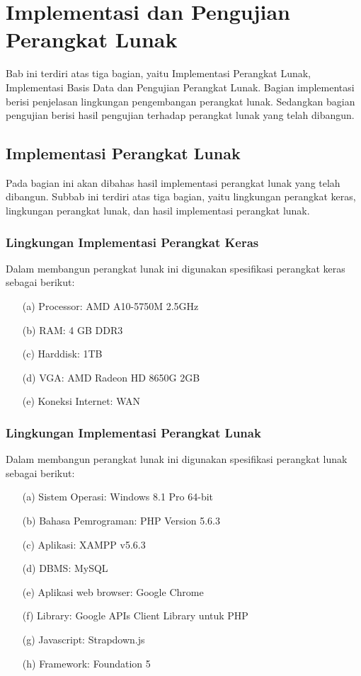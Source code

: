 \chapter{Implementasi dan Pengujian Perangkat Lunak}
\label{chap:implementasidanpengujian}

Bab ini terdiri atas tiga bagian, yaitu Implementasi Perangkat Lunak, Implementasi Basis Data dan Pengujian Perangkat Lunak. Bagian implementasi berisi penjelasan lingkungan pengembangan perangkat lunak. Sedangkan bagian pengujian berisi hasil pengujian terhadap perangkat lunak yang telah dibangun.

\section{Implementasi Perangkat Lunak}
\label{sec:implementasiperangkatlunak}

Pada bagian ini akan dibahas hasil implementasi perangkat lunak yang telah dibangun. Subbab ini terdiri atas tiga bagian, yaitu lingkungan perangkat keras, lingkungan perangkat lunak, dan hasil implementasi perangkat lunak.

\subsection{Lingkungan Implementasi Perangkat Keras}
\label{sec:lingkunganimplementasiperangkatkeras}

Dalam membangun perangkat lunak ini digunakan spesifikasi perangkat keras sebagai berikut:

\begin{enumerate}
\item[(a)] Processor: AMD A10-5750M 2.5GHz
\item[(b)] RAM: 4 GB DDR3
\item[(c)] Harddisk: 1TB
\item[(d)] VGA: AMD Radeon HD 8650G 2GB
\item[(e)] Koneksi Internet: WAN
\end{enumerate}

\subsection{Lingkungan Implementasi Perangkat Lunak}
\label{sec:lingkunganimplementasiperangkatlunak}

Dalam membangun perangkat lunak ini digunakan spesifikasi perangkat lunak sebagai berikut:

\begin{enumerate}
\item[(a)] Sistem Operasi: Windows 8.1 Pro 64-bit
\item[(b)] Bahasa Pemrograman: PHP Version 5.6.3
\item[(c)] Aplikasi: XAMPP v5.6.3
\item[(d)] DBMS: MySQL
\item[(e)] Aplikasi web browser: Google Chrome
\item[(f)] Library: Google APIs Client Library untuk PHP
\item[(g)] Javascript: Strapdown.js
\item[(h)] Framework: Foundation 5
\end{enumerate}

